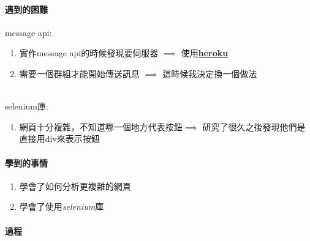 \documentclass[12pt]{ctexart}
\begin{document}
\paragraph{遇到的困難}
\begin{adjustwidth}{2em}{0em}

message api:
\begin{adjustwidth}{2em}{0em}
\begin{enumerate}
    \item 
        實作message api的時候發現要伺服器 $\implies$ 使用\href{https://www.heroku.com/}{\textbf{heroku}}
    \item 
        需要一個群組才能開始傳送訊息 $\implies$ 這時候我決定換一個做法
\end{enumerate}
\end{adjustwidth}


\hspace*{\fill}\\
selenium庫: 

\begin{adjustwidth}{2em}{0em}
\begin{enumerate}
    \item
        網頁十分複雜，不知道哪一個地方代表按鈕$\implies$ 研究了很久之後發現他們是直接用div來表示按鈕
\end{enumerate}
\end{adjustwidth}

\end{adjustwidth}

\paragraph{ 學到的事情 }
\begin{adjustwidth}{2em}{0em}
\begin{enumerate}
    \item 
        學會了如何分析更複雜的網頁
    \item
        學會了使用\textit{selenium}庫
\end{enumerate}

    
\end{adjustwidth}

\clearpage
\paragraph{ 過程 }
\hspace*{\fill}\\

\end{document}

